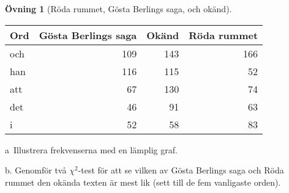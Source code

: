\documentclass[
]{book}
\theoremstyle{definition}
\theoremstyle{definition}
\theoremstyle{definition}
\newtheorem{exercise}{Övning}[chapter]
\theoremstyle{definition}
\theoremstyle{remark}
\begin{document}
\begin{exercise}[Röda rummet, Gösta Berlings saga, och okänd]
\begin{table}
\centering
\begin{tabular}[t]{lrrr}
\toprule
Ord & Gösta Berlings saga & Okänd & Röda rummet\\
\midrule
och & 109 & 143 & 166\\
han & 116 & 115 & 52\\
att & 67 & 130 & 74\\
det & 46 & 91 & 63\\
i & 52 & 58 & 83\\
\bottomrule
\end{tabular}
\end{table}

a~Illustrera frekvenserna med en lämplig graf.

b. Genomför två \(\chi^2\)-test för att se vilken av Gösta Berlings saga och Röda rummet den okända texten är mest lik (sett till de fem vanligaste orden).
\end{exercise}
\end{document}
